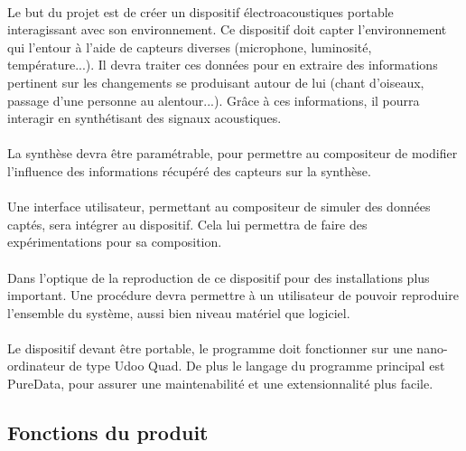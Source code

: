 \documentclass[a4paper, titlepage, oneside, 12pt]{article}%
\begin{document}
\paragraph{}
Le but du projet est de créer un dispositif électroacoustiques portable interagissant avec son environnement.
Ce dispositif doit capter l'environnement qui l'entour à l'aide de capteurs diverses (microphone, luminosité, température...). 
Il devra traiter ces données pour en extraire des informations pertinent sur les changements se produisant autour de lui (chant d'oiseaux, passage d'une personne au alentour...).
Grâce à ces informations, il pourra interagir en synthétisant des signaux acoustiques.

\paragraph{}
La synthèse devra être paramétrable, pour permettre au compositeur de modifier l’influence des informations récupéré des capteurs sur la synthèse.

\paragraph{}
Une interface utilisateur, permettant au compositeur de simuler des données captés, sera intégrer au dispositif. Cela lui permettra de faire des expérimentations pour sa composition.\\

\paragraph{}
Dans l'optique de la reproduction de ce dispositif pour des installations plus important. Une procédure devra permettre à un utilisateur de pouvoir reproduire l'ensemble du système, aussi bien niveau matériel que logiciel.

\paragraph{}
Le dispositif devant être portable, le programme doit fonctionner sur une nano-ordinateur de type Udoo Quad. De plus le langage du programme principal est PureData, pour assurer une maintenabilité et une extensionnalité plus facile.


\subsection{Fonctions du produit}
\end{document}
